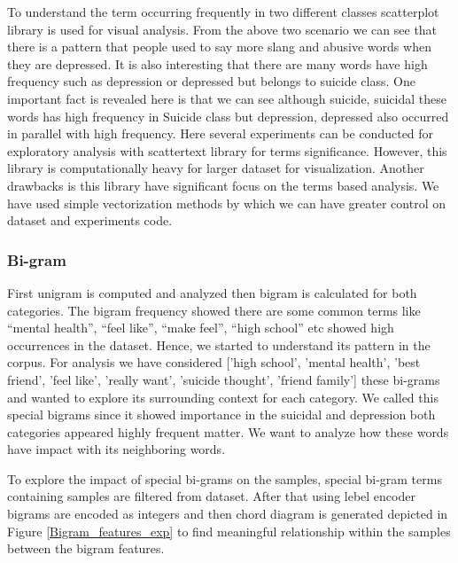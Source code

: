 \documentclass[sn-mathphys,Numbered]{sn-jnl}%
\theoremstyle{thmstyleone}%
\theoremstyle{thmstyletwo}%
\theoremstyle{thmstylethree}%
\begin{document}
To understand the term occurring frequently in two different classes scatterplot library is used for visual analysis. From the above two scenario we can see that there is a pattern that people used to say more slang and abusive words when they are depressed. It is also interesting that there are many words have high frequency such as depression or depressed but belongs to suicide class. One important fact is revealed here is that we can see although suicide, suicidal these words has high frequency in Suicide class but depression, depressed also occurred in parallel with high frequency. Here several experiments can be conducted for exploratory analysis with scattertext library for terms significance. However, this library is computationally heavy for larger dataset for visualization. Another drawbacks is this library have significant focus on the terms based analysis. We have used simple vectorization methods by which we can have greater control on dataset and experiments code. 

\subsubsection{Bi-gram}
First unigram is computed and analyzed then bigram is calculated for both categories. The bigram frequency showed there are some common terms like “mental health”, “feel like”, “make feel”, “high school” etc showed high occurrences in the dataset. Hence, we started to understand its pattern in the corpus. For analysis we have considered ['high school', 'mental health', 'best friend', 'feel like', 'really want', 'suicide thought', 'friend family'] these bi-grams and wanted to explore its surrounding context for each category. We called this special bigrams since it showed importance in the suicidal and depression both categories appeared highly frequent matter. We want to analyze how these words have impact with its neighboring words. 

To explore the impact of special bi-grams on the samples, special bi-gram terms containing samples are filtered from dataset. After that using lebel encoder bigrams are encoded as integers and then chord diagram is generated  depicted in Figure \ref{Bigram_features_exp} to find meaningful relationship within the samples between the bigram features.  
\end{document}
